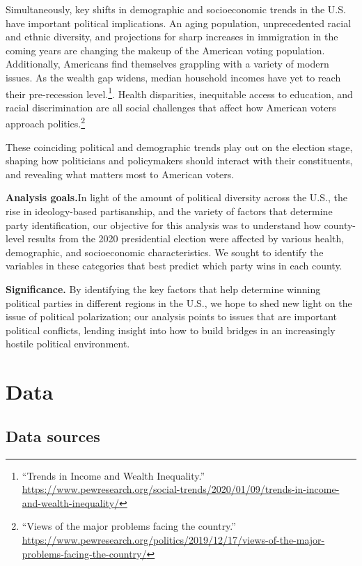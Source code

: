 \documentclass[
]{article}
\begin{document}
Simultaneously, key shifts in demographic and socioeconomic trends in the U.S. have important political implications. An aging population, unprecedented racial and ethnic diversity, and projections for sharp increases in immigration in the coming years are changing the makeup of the American voting population. Additionally, Americans find themselves grappling with a variety of modern issues. As the wealth gap widens, median household incomes have yet to reach their pre-recession level.\footnote{``Trends in Income and Wealth Inequality.'' \url{https://www.pewresearch.org/social-trends/2020/01/09/trends-in-income-and-wealth-inequality/}}. Health disparities, inequitable access to education, and racial discrimination are all social challenges that affect how American voters approach politics.\footnote{``Views of the major problems facing the country.'' \url{https://www.pewresearch.org/politics/2019/12/17/views-of-the-major-problems-facing-the-country/}}

These coinciding political and demographic trends play out on the election stage, shaping how politicians and policymakers should interact with their constituents, and revealing what matters most to American voters.

\textbf{Analysis goals.}In light of the amount of political diversity across the U.S., the rise in ideology-based partisanship, and the variety of factors that determine party identification, our objective for this analysis was to understand how county-level results from the 2020 presidential election were affected by various health, demographic, and socioeconomic characteristics. We sought to identify the variables in these categories that best predict which party wins in each county.

\textbf{Significance.} By identifying the key factors that help determine winning political parties in different regions in the U.S., we hope to shed new light on the issue of political polarization; our analysis points to issues that are important political conflicts, lending insight into how to build bridges in an increasingly hostile political environment.

\hypertarget{data}{%
\section{Data}\label{data}}

\hypertarget{data-sources}{%
\subsection{Data sources}\label{data-sources}}
\end{document}

